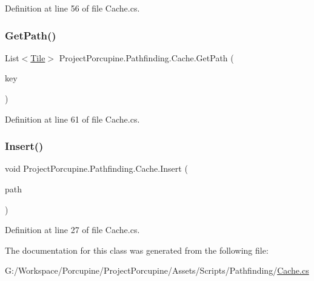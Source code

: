Definition at line 56 of file Cache.\+cs.

\mbox{\label{class_project_porcupine_1_1_pathfinding_1_1_cache_a8841b12309dda8211809add9269da9dc}} 
\subsubsection{\texorpdfstring{Get\+Path()}{GetPath()}\hspace{0.1cm}{\footnotesize\ttfamily [2/2]}}
{\footnotesize\ttfamily List$<$\hyperlink{class_tile}{Tile}$>$ Project\+Porcupine.\+Pathfinding.\+Cache.\+Get\+Path (\begin{DoxyParamCaption}\item[{\hyperlink{class_project_porcupine_1_1_pathfinding_1_1_cache_1_1_cache_key}{Cache\+Key}}]{key }\end{DoxyParamCaption})}



Definition at line 61 of file Cache.\+cs.

\mbox{\label{class_project_porcupine_1_1_pathfinding_1_1_cache_aaae72387671f323d735f007d47229cdd}} 
\subsubsection{\texorpdfstring{Insert()}{Insert()}}
{\footnotesize\ttfamily void Project\+Porcupine.\+Pathfinding.\+Cache.\+Insert (\begin{DoxyParamCaption}\item[{List$<$ \hyperlink{class_tile}{Tile} $>$}]{path }\end{DoxyParamCaption})}



Definition at line 27 of file Cache.\+cs.



The documentation for this class was generated from the following file\+:\begin{DoxyCompactItemize}
\item 
G\+:/\+Workspace/\+Porcupine/\+Project\+Porcupine/\+Assets/\+Scripts/\+Pathfinding/\hyperlink{_cache_8cs}{Cache.\+cs}\end{DoxyCompactItemize}
